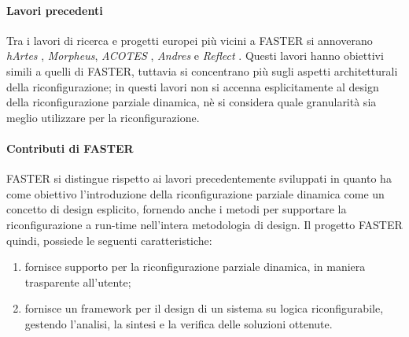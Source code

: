 \paragraph{Lavori precedenti}
Tra i lavori di ricerca e progetti europei più vicini a \ac{FASTER} si 
annoverano \emph{hArtes} \cite{HArtes}, \emph{Morpheus}, \emph{ACOTES} 
\cite{AcotesUrl, ACOTES}, \emph{Andres} e \emph{Reflect} \cite{Reflect}.
Questi lavori hanno obiettivi simili a quelli di \ac{FASTER}, tuttavia si 
concentrano più sugli aspetti architetturali della riconfigurazione; in questi 
lavori non si accenna esplicitamente al design della riconfigurazione parziale 
dinamica, nè si considera quale granularità sia meglio utilizzare per la 
riconfigurazione. 


\paragraph{Contributi di \ac{FASTER}}
\ac{FASTER} si distingue rispetto ai lavori precedentemente sviluppati in 
quanto ha come obiettivo l'introduzione della riconfigurazione parziale 
dinamica come un concetto di design esplicito, fornendo anche i metodi per 
supportare la riconfigurazione a run-time nell'intera metodologia di design.
Il progetto \ac{FASTER} quindi, possiede le seguenti caratteristiche:
\begin{enumerate}
 \item fornisce supporto per la riconfigurazione parziale 
dinamica, in maniera trasparente 
all'utente;
 \item fornisce un framework per il design di un sistema su logica 
riconfigurabile, gestendo l'analisi, la sintesi e la verifica delle soluzioni 
ottenute.
\end{enumerate}

